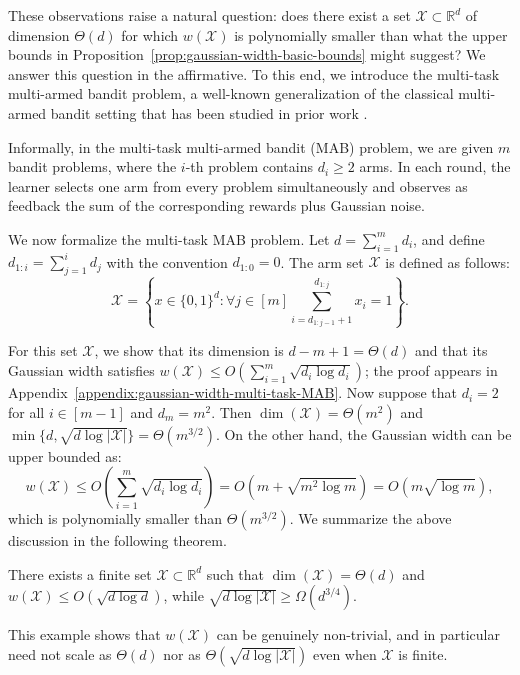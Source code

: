 These observations raise a natural question: does there exist a set $\mathcal{X}\subset \mathbb{R}^d$ of dimension $\Theta(d)$ for which $w(\mathcal{X})$ is polynomially smaller than what the upper bounds in Proposition~\ref{prop:gaussian-width-basic-bounds} might suggest?
We answer this question in the affirmative.
To this end, we introduce the multi-task multi-armed bandit problem, a well-known generalization of the classical multi-armed bandit setting that has been studied in prior work \citep{cesa2012combinatorial,cohen2017tight,maiti2025efficient,fan2025universal}.


Informally, in the multi-task multi-armed bandit (MAB) problem, we are given $m$ bandit problems, where the $i$-th problem contains $d_i \ge 2$ arms.
In each round, the learner selects one arm from every problem simultaneously and observes as feedback the sum of the corresponding rewards plus Gaussian noise.


We now formalize the multi-task MAB problem.
Let $d=\sum_{i=1}^m d_i$, and define $d_{1:i}=\sum_{j=1}^i d_j$ with the convention $d_{1:0}=0$.
The arm set $\mathcal{X}$ is defined as follows:
\begin{equation*}
    \mathcal X=\left\{x\in \{0,1\}^d: \forall j\in [m] \sum_{i=d_{1:j-1}+1}^{d_{1:j}} x_i=1\right\}.
\end{equation*}

For this set $\mathcal{X}$, we show that its dimension is $d-m+1=\Theta(d)$ and that its Gaussian width satisfies
$w(\mathcal{X}) \le O\!\left(\sum_{i=1}^m \sqrt{d_i\log d_i}\right)$; the proof appears in Appendix~\ref{appendix:gaussian-width-multi-task-MAB}.
Now suppose that $d_i=2$ for all $i\in[m-1]$ and $d_m=m^2$.
Then $\dim(\mathcal{X})=\Theta(m^2)$ and $\min\{d,\sqrt{d\log|\mathcal{X}|}\}=\Theta(m^{3/2})$.
On the other hand, the Gaussian width can be upper bounded as:
\[
w(\mathcal{X})\le O\!\left(\sum_{i=1}^m\sqrt{d_i\log d_i}\right)
= O\!\left(m+\sqrt{m^2\log m}\right)
= O\!\left(m\sqrt{\log m}\right),
\]
which is polynomially smaller than $\Theta(m^{3/2})$. We summarize the above discussion in the following theorem.
\begin{theorem}\label{thm:gaussian-width-separation}
There exists a finite set $\mathcal{X}\subset\mathbb{R}^d$ such that $\dim(\mathcal{X})=\Theta(d)$ and $w(\mathcal{X})\le O(\sqrt{d\log d})$, while $\sqrt{d\log|\mathcal{X}|}\ge \Omega(d^{3/4})$.
\end{theorem}
This example shows that $w(\mathcal{X})$ can be genuinely non-trivial, and in particular need not scale as $\Theta(d)$ nor as $\Theta(\sqrt{d\log|\mathcal{X}|})$ even when $\mathcal{X}$ is finite.




